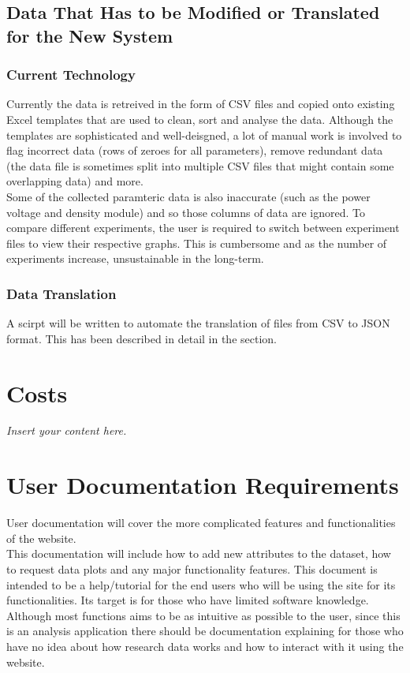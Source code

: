 \documentclass[12pt]{article}
\newcommand{\lips}{\textit{Insert your content here.}}
\begin{document}
\subsection{Data That Has to be Modified or Translated for the New System}
\subsubsection{Current Technology}
Currently the data is retreived in the form of CSV files and copied onto existing Excel templates that are used to clean, sort and analyse 
the data. Although the templates are sophisticated and well-deisgned, a lot of manual work is involved to flag incorrect data (rows of zeroes for 
all parameters), remove redundant data (the data file is sometimes split into multiple CSV files that might contain some overlapping data) and more.\\
\newline
Some of the collected paramteric data is also inaccurate (such as the power voltage and density module) and so those columns of data are ignored.
To compare different experiments, the user is required to switch between experiment files to view their respective graphs. This is cumbersome and as 
the number of experiments increase, unsustainable in the long-term.

\subsubsection{Data Translation}
A scirpt will be written to automate the translation of files from CSV to JSON format. This has been described in detail in the  section.

\section{Costs}
\lips
\section{User Documentation Requirements}
User documentation will cover the more complicated features and functionalities of the website.\\

\noindent This documentation will include how to add new attributes to the dataset, how
to request data plots and any major functionality features. \newline
This document is intended to be a help/tutorial for the end users who will be
using the site for its functionalities. Its target is for those who have limited
software knowledge. Although most functions aims to be as intuitive as possible
to the user, since this is an analysis application there should be documentation
explaining for those who have no idea about how research data works and how to
interact with it using the website.
\end{document}
